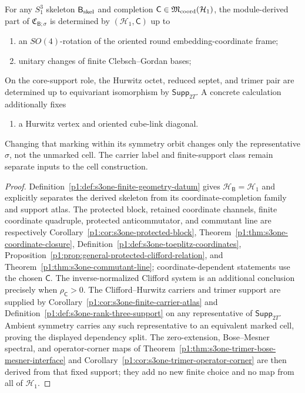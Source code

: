 \documentclass[11pt]{article}
\begin{document}
\begin{theorem}[Structure and dependency split of the \(m=1\) finite cell]
\label{p1:thm:s3one-finite-cell-structure}
For any \(S^3_1\) skeleton \(\mathsf B_{\rm skel}\) and completion
\(\mathsf C\in\mathfrak M_{\rm coord}(\mathcal H_1)\), the module-derived part
of \(\mathfrak C_{\mathsf B;\sigma}\) is determined by
\((\mathcal H_1,\mathsf C)\) up to
\begin{enumerate}[label=(\roman*)]
    \item an \(SO(4)\)-rotation of the oriented round embedding-coordinate frame;
    \item unitary changes of finite Clebsch--Gordan bases;
\end{enumerate}
On the core-support role, the Hurwitz octet, reduced septet, and trimer pair
are determined up to equivariant isomorphism by
\(\mathsf{Supp}_{2T}\).  A concrete calculation additionally fixes
\begin{enumerate}[label=(\roman*),resume]
    \item a Hurwitz vertex and oriented cube-link diagonal.
\end{enumerate}
Changing that marking within its symmetry orbit changes only the
representative \(\sigma\), not the unmarked cell. The carrier label and
finite-support class remain separate inputs to the cell construction.
\end{theorem}

\begin{proof}
Definition~\ref{p1:def:s3one-finite-geometry-datum} gives
\(\mathcal H_{\mathsf B}=\mathcal H_1\) and explicitly separates the derived
skeleton from its coordinate-completion family and support atlas.  The protected block,
retained coordinate channels, finite coordinate quadruple, protected
anticommutator, and commutant line are respectively
Corollary~\ref{p1:cor:s3one-protected-block},
Theorem~\ref{p1:thm:s3one-coordinate-closure},
Definition~\ref{p1:def:s3one-toeplitz-coordinates},
Proposition~\ref{p1:prop:general-protected-clifford-relation}, and
Theorem~\ref{p1:thm:s3one-commutant-line}; coordinate-dependent statements
use the chosen \(\mathsf C\).  The inverse-normalized Clifford system is an
additional conclusion precisely when \(\rho_{\mathsf C}>0\).
The Clifford--Hurwitz carriers and trimer support are supplied by
Corollary~\ref{p1:cor:s3one-finite-carrier-atlas} and
Definition~\ref{p1:def:s3one-rank-three-support} on any representative of
\(\mathsf{Supp}_{2T}\).  Ambient symmetry carries any such representative to
an equivalent marked cell, proving the displayed dependency split.  The
zero-extension, Bose--Mesner spectral,
and operator-corner maps of
Theorem~\ref{p1:thm:s3one-trimer-bose-mesner-interface} and
Corollary~\ref{p1:cor:s3one-trimer-operator-corner} are then derived from that
fixed support; they add no new finite choice and no map from all of
\(\mathcal H_1\).
\end{proof}
\end{document}
